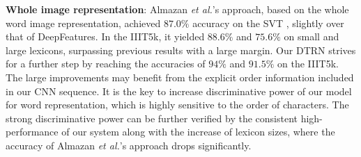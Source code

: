 \documentclass[letterpaper]{article}
\begin{document}
%
%



\textbf{Whole image representation}:
Almazan \emph{et al.}'s approach, based on the whole word image representation, achieved $87.0\%$ accuracy on the SVT \cite{Almazan2014}, slightly over that of DeepFeatures. In the IIIT5k, it yielded $88.6\%$ and $75.6\%$ on small and large lexicons, surpassing previous results with a large margin. Our DTRN strives for a further step by reaching the accuracies of $94\%$ and $91.5\%$ on the IIIT5k. The large improvements may benefit from the explicit order information included in our CNN sequence. It is the key to increase discriminative power of our model for word representation, which is highly sensitive to the order of characters. The strong discriminative power can be further verified by the consistent high-performance of our system along with the increase of lexicon sizes, where the accuracy of Almazan \emph{et al.}'s approach drops significantly.
\end{document}
